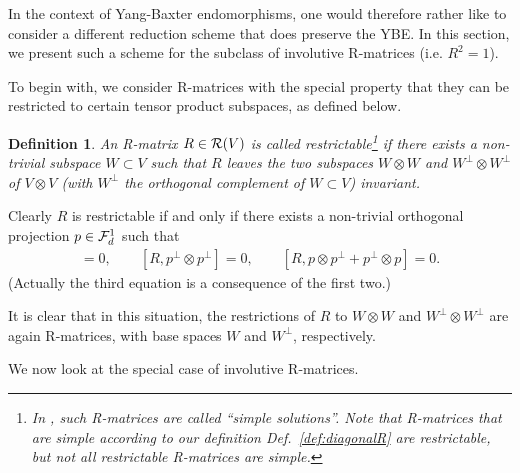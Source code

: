 \documentclass[12pt,a4paper]{amsart}
\numberwithin{equation}{section}
\newtheorem{definition}[theorem]{Definition}
\theoremstyle{remark}
\newcommand{\ot}{\otimes}
\begin{document}
In the context of Yang-Baxter endomorphisms, one would therefore rather like to consider a different reduction scheme that does preserve the YBE. In this section, we present such a scheme for the subclass of involutive R-matrices (i.e. $R^2=1$).

\medskip 

To begin with, we consider R-matrices with the special property that they can be restricted to certain tensor product subspaces, as defined below.

\begin{definition}
    An R-matrix $R\in\mathcal{R}(V)$ is called {\em restrictable}\footnote{In \cite{Hietarinta:1993_3_2}, such R-matrices are called ``simple solutions''. Note that R-matrices that are simple according to our definition Def.~\ref{def:diagonalR} are restrictable, but not all restrictable R-matrices are simple.} 
    if there exists a non-trivial subspace $W\subset V$ such that $R$ leaves the two subspaces $W\ot W$ and $W^\perp\ot W^\perp$  of $V\ot V$ (with $W^\perp$ the orthogonal complement of $W\subset V$) invariant. 
\end{definition}

Clearly $R$ is restrictable if and only if there exists a non-trivial orthogonal projection $p\in\mathcal{F}_d^1$ such that 
\begin{align}
 [R,p\ot p]=0,\qquad [R,p^\perp\ot p^\perp]=0,\qquad [R,p\ot p^\perp+p^\perp\ot p]=0.
\end{align}
(Actually the third equation is a consequence of the first two.)

It is clear that in this situation, the restrictions of $R$ to $W\ot W$ and $W^\perp\ot W^\perp$ are again R-matrices, with base spaces $W$ and $W^\perp$, respectively. 

We now look at the special case of involutive R-matrices.
\end{document}
